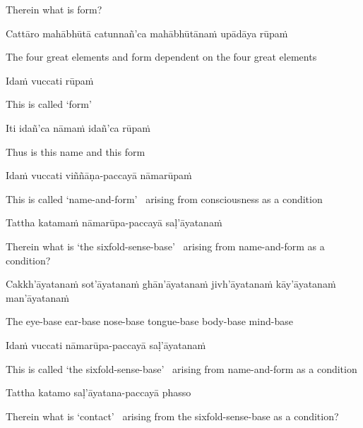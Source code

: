 \begin{english}
  Therein what is form?
\end{english}

Cattāro mahābhūtā catunnañ'ca mahābhūtānaṁ upādāya rūpaṁ

\begin{english-hang}
  The four great elements and form dependent on the four great elements
\end{english-hang}

Idaṁ vuccati rūpaṁ

\begin{english}
  This is called `form'
\end{english}

Iti idañ'ca nāmaṁ idañ'ca rūpaṁ

\begin{english}
  Thus is this name and this form
\end{english}

Idaṁ vuccati viññāṇa-paccayā nāmarūpaṁ

\begin{english-hang}
  This is called `name-and-form' \breathmark\ arising from consciousness as a condition
\end{english-hang}

Tattha katamaṁ nāmarūpa-paccayā saḷ'āyatanaṁ

\begin{english-hang}
  Therein what is `the sixfold-sense-base' \breathmark\ arising from name-and-form as a condition?
\end{english-hang}

\begin{pali-hang}
  Cakkh'āyatanaṁ sot'āyatanaṁ ghān'āyatanaṁ jivh'āyatanaṁ kāy'āyatanaṁ man'āyatanaṁ
\end{pali-hang}

\begin{english-hang}
  The eye-base ear-base nose-base tongue-base body-base mind-base
\end{english-hang}

Idaṁ vuccati nāmarūpa-paccayā saḷ'āyatanaṁ

\begin{english-hang}
  This is called `the sixfold-sense-base' \breathmark\ arising from name-and-form as a condition
\end{english-hang}

Tattha katamo saḷ'āyatana-paccayā phasso

\begin{english-hang}
  Therein what is `contact' \breathmark\ arising from the sixfold-sense-base as a condition?
\end{english-hang}

